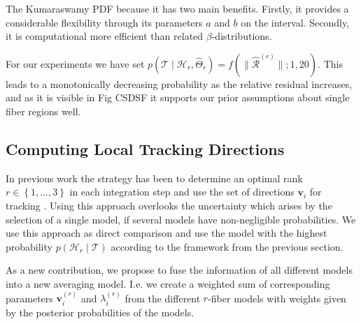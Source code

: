 The Kumaraswamy PDF because it has two main benefits. Firstly, it
provides a considerable flexibility through its parameters $a$ and $b$ on the
interval. Secondly, it is computational more efficient than related
$\beta$-distributions. 

For our experiments we have set $p \left(  \mathcal{T} \mid \mathcal{H}_r,
\hat{\Theta}_r \right) = f \left(  \| \hat{\mathcal{R}}^{\left( r \right)} \| ; 1,20
\right)$. This leads to a monotonically decreasing probability as the relative
residual increases, and as it is visible in Fig CSDSF it supports our prior
assumptions about single fiber regions well.

\subsection{Computing Local Tracking Directions}
In previous work the strategy has been to determine an optimal rank $r \in
\left\{ 1,\dots , 3 \right\}$ in each integration step and use the set of
directions $\mathbf{v}_i$ for tracking \cite{Anekele:CARS2017}. Using this
approach overlooks the uncertainty which arises by the selection of a single
model, if several models have non-negligible probabilities. We use this approach
as direct comparison and use the model with the highest probability $p \left(
 \mathcal{H}_r \mid \mathcal{T} \right)$ according to the framework from the
 previous section.
 
As a new contribution, we propose to fuse the information of all different
models into a new averaging model. I.e. we create a weighted sum of
corresponding parameters $\mathbf{v}_i^{\left( r \right)}$ and
$\lambda_i^{\left( r \right)}$ from the different
$r$-fiber models with weights given by the posterior probabilities of the
models.
